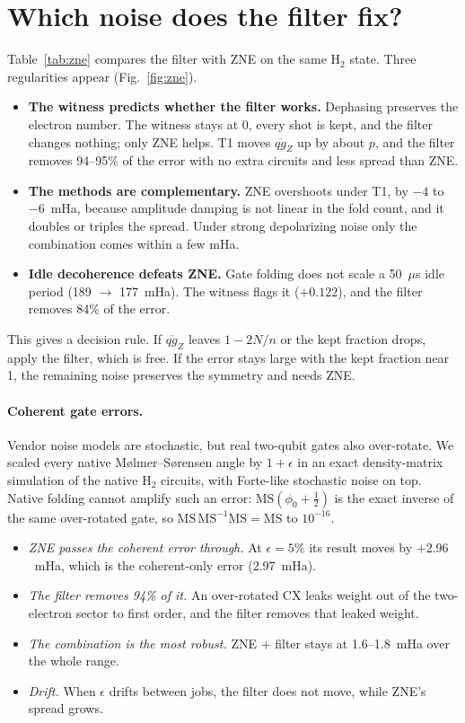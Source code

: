 \documentclass[11pt]{article}
\newcommand{\mqg}{\overline{qg}_Z}
\begin{document}
\section{Which noise does the filter fix?}\label{sec:zne}

Table~\ref{tab:zne} compares the filter with ZNE on the same H$_2$ state. Three regularities appear
(Fig.~\ref{fig:zne}).
\begin{itemize}
\item \textbf{The witness predicts whether the filter works.} Dephasing preserves the electron
number. The witness stays at 0, every shot is kept, and the filter changes nothing; only ZNE helps.
T1 moves $\mqg$ up by about $p$, and the filter removes 94--95\% of the error with no extra circuits
and less spread than ZNE.
\item \textbf{The methods are complementary.} ZNE overshoots under T1, by $-4$ to $-6$~mHa, because
amplitude damping is not linear in the fold count, and it doubles or triples the spread. Under strong
depolarizing noise only the combination comes within a few mHa.
\item \textbf{Idle decoherence defeats ZNE.} Gate folding does not scale a 50~$\mu$s idle period
(189 $\to$ 177~mHa). The witness flags it ($+0.122$), and the filter removes 84\% of the error.
\end{itemize}
This gives a decision rule. If $\mqg$ leaves $1-2N/n$ or the kept fraction drops, apply the filter,
which is free. If the error stays large with the kept fraction near 1, the remaining noise
preserves the symmetry and needs ZNE.

\paragraph{Coherent gate errors.} Vendor noise models are stochastic, but real two-qubit gates also
over-rotate. We scaled every native M{\o}lmer--S{\o}rensen angle by $1+\epsilon$ in an exact
density-matrix simulation of the native H$_2$ circuits, with Forte-like stochastic noise on top.
Native folding cannot amplify such an error: $\mathrm{MS}(\phi_0+\tfrac12)$ is the exact inverse of the
same over-rotated gate, so $\mathrm{MS}\,\mathrm{MS}^{-1}\mathrm{MS}=\mathrm{MS}$ to $10^{-16}$.
\begin{itemize}
\item \emph{ZNE passes the coherent error through.} At $\epsilon=5\%$ its result moves by $+2.96$~mHa,
which is the coherent-only error (2.97~mHa).
\item \emph{The filter removes 94\% of it.} An over-rotated CX leaks weight out of the two-electron
sector to first order, and the filter removes that leaked weight.
\item \emph{The combination is the most robust.} ZNE + filter stays at 1.6--1.8~mHa over the whole
range.
\item \emph{Drift.} When $\epsilon$ drifts between jobs, the filter does not move, while ZNE's spread
grows.
\end{itemize}
\end{document}
